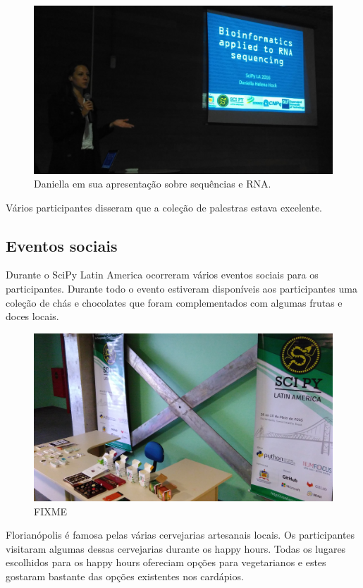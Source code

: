 \documentclass[12pt]{article}
\begin{document}
\begin{figure}[!htb]
\center
\includegraphics[height=.3\textheight]{talks-rna.jpg}
\caption{Daniella em sua apresentação sobre sequências e RNA.}
\end{figure}

Vários participantes disseram que a coleção de palestras estava excelente.

\subsection*{Eventos sociais}

Durante o SciPy Latin America ocorreram vários eventos sociais para os
participantes. Durante todo o evento estiveram disponíveis aos participantes uma
coleção de chás e chocolates que foram complementados com algumas frutas e doces
locais.

\begin{figure}[!htb]
\center
\includegraphics[height=.3\textheight]{social-break.jpg}
\caption{FIXME}
\end{figure}

Florianópolis é famosa pelas várias cervejarias artesanais locais.
Os participantes visitaram algumas dessas cervejarias durante os happy hours.
Todas os lugares escolhidos para os happy hours ofereciam opções para
vegetarianos e estes gostaram bastante das opções existentes nos cardápios.
\end{document}
